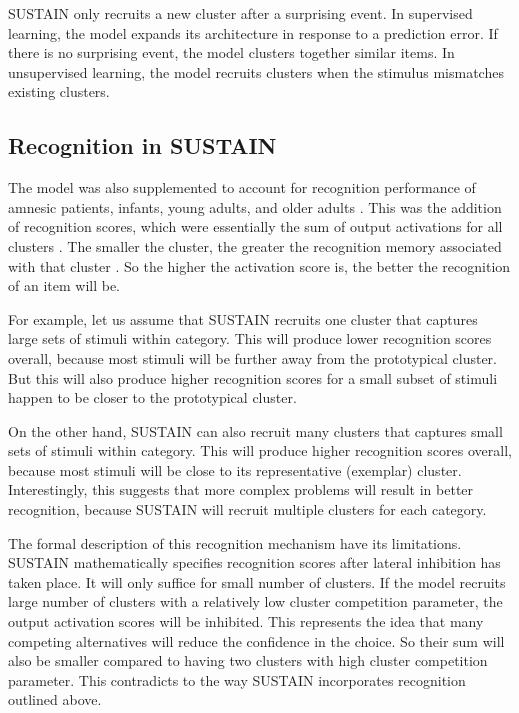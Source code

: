 \documentclass[12pt]{article}
\begin{document}
SUSTAIN only recruits a new cluster after a surprising event. In supervised
learning, the model expands its architecture in response to a prediction error.
If there is no surprising event, the model clusters together similar items. In
unsupervised learning, the model recruits clusters when the stimulus mismatches
existing clusters.


\subsection{Recognition in SUSTAIN}

The model was also supplemented to account for recognition performance 
of amnesic patients, infants, young adults, and older adults \cite{Love2007}. 
This was the addition of recognition scores, 
which were essentially the sum of output activations for all clusters \cite<Equation A6 in>{Love2007}.
The smaller the cluster, the greater the recognition memory associated with that cluster \cite{Davis2012a}.
So the higher the activation score is, the better the recognition of an item will be.

For example, let us assume that SUSTAIN recruits one cluster that captures 
large sets of stimuli within category. This will produce lower recognition scores overall,
because most stimuli will be further away from the prototypical cluster. But this will
also produce higher recognition scores for a small subset of stimuli happen
to be closer to the prototypical cluster.

On the other hand, SUSTAIN can also recruit many clusters that captures
small sets of stimuli within category. This will produce higher recognition scores
overall, because most stimuli will be close to its representative (exemplar) cluster.
Interestingly, this suggests that more complex problems will result in better recognition,
because SUSTAIN will recruit multiple clusters for each category.

The formal description of this recognition mechanism have its limitations. 
SUSTAIN mathematically specifies recognition scores after lateral inhibition
has taken place. It will only suffice for small number of clusters. If the model
recruits large number of clusters with a relatively low cluster competition 
parameter, the output activation scores \cite<Equation 6>{Love2004}
will be inhibited. This represents the idea that many competing alternatives
will reduce the confidence in the choice. So their sum will also be smaller
compared to having two clusters with high cluster competition parameter.
This contradicts to the way SUSTAIN incorporates recognition outlined above.
\end{document}
